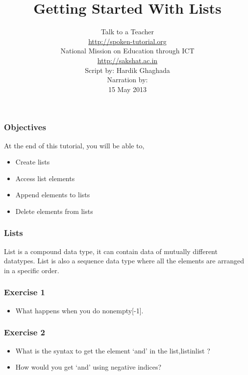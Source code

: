 \documentclass[17pt]{beamer}
\author[FOSSEE]{}
\institute[IIT Bombay]{}
\date[]{}
\begin{document}
\sffamily \bfseries
\title
[Getting Started With Lists]
{Getting Started With Lists}
\author
[FOSSEE, IIT - Bombay]
{\small Talk to a Teacher\\{\color{blue}\url{http://spoken-tutorial.org}}\\National Mission on Education
 through ICT\\{\color{blue}\url{http://sakshat.ac.in}} \\ [0.8cm]Script by: Hardik Ghaghada \\ Narration by: \\
 [0.5cm]
{\small 15 May 2013}}

\begin{frame}
  \titlepage
\end{frame}
\begin{frame}
\frametitle{Objectives}
  At the end of this tutorial, you will be able to, 
\begin{itemize}
\item Create lists
\item Access list elements
\item Append elements to lists
\item Delete elements from lists
\end{itemize}
\end{frame}
\begin{frame}
\frametitle{Lists}
List is a compound data type, it can contain data of mutually
different datatypes. List is also a sequence data type where all the
elements are arranged in a specific order.
\end{frame}
\begin{frame}
\frametitle{Exercise 1}
\begin{itemize}
\item What happens when you do nonempty[-1].
\end{itemize}
\end{frame}
\begin{frame}
\frametitle{Exercise 2}
\begin{itemize}
\item What is the syntax to get the element `and' 
     in the list,listinlist ?
\item How would you get `and' using negative indices?
\end{itemize}
\end{frame}
\end{document}
